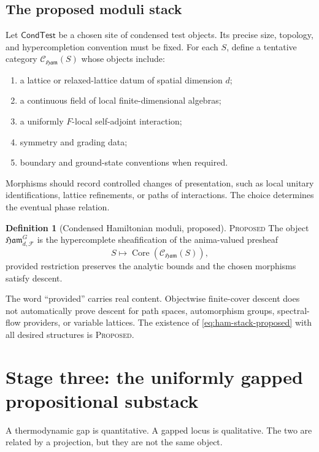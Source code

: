 \documentclass[12pt]{article}
\theoremstyle{definition}
\newtheorem{definition}[theorem]{Definition}
\theoremstyle{remark}
\newcommand{\C}{\mathcal C}
\newcommand{\F}{\mathcal F}
\newcommand{\Ham}{\mathfrak{Ham}}
\newcommand{\Core}{\operatorname{Core}}
\newcommand{\PROP}{\textnormal{\textsc{Proposed}}}
\begin{document}
\subsection{The proposed moduli stack}

Let $\mathsf{CondTest}$ be a chosen site of condensed test objects.  Its
precise size, topology, and hypercompletion convention must be fixed.  For
each $S$, define a tentative category $\C_{\Ham}(S)$ whose objects include:
\begin{enumerate}[leftmargin=2.2em]
  \item a lattice or relaxed-lattice datum of spatial dimension $d$;
  \item a continuous field of local finite-dimensional algebras;
  \item a uniformly $F$-local self-adjoint interaction;
  \item symmetry and grading data;
  \item boundary and ground-state conventions when required.
\end{enumerate}
Morphisms should record controlled changes of presentation, such as local
unitary identifications, lattice refinements, or paths of interactions.  The
choice determines the eventual phase relation.

\begin{definition}[Condensed Hamiltonian moduli, proposed]
\PROP{}  The object $\Ham_{d,\F}^G$ is the hypercomplete sheafification of
the anima-valued presheaf
\begin{equation}
S\longmapsto\Core(\C_{\Ham}(S)),
\label{eq:ham-stack-proposed}
\end{equation}
provided restriction preserves the analytic bounds and the chosen
morphisms satisfy descent.
\end{definition}

The word ``provided'' carries real content.  Objectwise finite-cover descent
does not automatically prove descent for path spaces, automorphism groups,
spectral-flow providers, or variable lattices.  The existence of
\cref{eq:ham-stack-proposed} with all desired structures is \PROP{}.

\section{Stage three: the uniformly gapped propositional substack}

A thermodynamic gap is quantitative.  A gapped locus is qualitative.  The
two are related by a projection, but they are not the same object.
\end{document}
